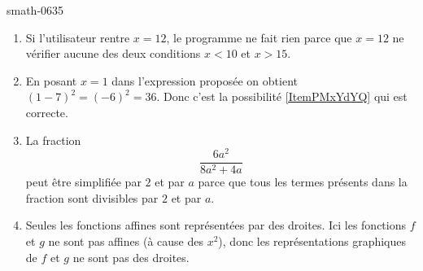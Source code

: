 
\begin{corrige}{smath-0635}

    \begin{enumerate}
        \item
            Si l'utilisateur rentre \( x=12\), le programme ne fait rien parce que \( x=12\) ne vérifier aucune des deux conditions \( x<10\) et \( x>15\).
        \item
            En posant \( x=1\) dans l'expression proposée on obtient \( (1-7)^2=(-6)^2=36\). Donc c'est la possibilité \ref{ItemPMxYdYQ} qui est correcte.
        \item
            La fraction 
            \begin{equation}
                \frac{ 6a^2 }{ 8a^2+4a }
            \end{equation}
            peut être simplifiée par \( 2\) et par \( a\) parce que tous les termes présents dans la fraction sont divisibles par \( 2\) et par \( a\).
        \item
            Seules les fonctions affines sont représentées par des droites. Ici les fonctions \( f\) et \( g\) ne sont pas affines (à cause des \( x^2\)), donc les représentations graphiques de \( f\) et \( g\) ne sont pas des droites.
    \end{enumerate}

\end{corrige}
